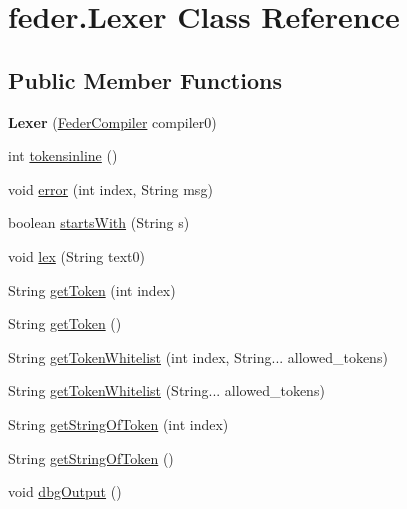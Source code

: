 \hypertarget{classfeder_1_1Lexer}{}\section{feder.\+Lexer Class Reference}
\label{classfeder_1_1Lexer}
\subsection*{Public Member Functions}
\begin{DoxyCompactItemize}
\item 
\mbox{\label{classfeder_1_1Lexer_a4642c5b1fb5d7a20d7d076ffab0a236b}} 
{\bfseries Lexer} (\hyperlink{classfeder_1_1FederCompiler}{Feder\+Compiler} compiler0)
\item 
int \hyperlink{classfeder_1_1Lexer_a4278e0e494f8a716e69bc9d24834da19}{tokensinline} ()
\item 
void \hyperlink{classfeder_1_1Lexer_abd8b18eca822366aa2d9668b9991346b}{error} (int index, String msg)
\item 
boolean \hyperlink{classfeder_1_1Lexer_aebe48a23dda741c897806ab3413f711f}{starts\+With} (String s)
\item 
void \hyperlink{classfeder_1_1Lexer_a69679a02624d16be3b567fd2aa71be57}{lex} (String text0)
\item 
String \hyperlink{classfeder_1_1Lexer_a7d9ad2063076fe1ba3b005024537a629}{get\+Token} (int index)
\item 
String \hyperlink{classfeder_1_1Lexer_a61a77f59e6000f6f6989d700e7902949}{get\+Token} ()
\item 
String \hyperlink{classfeder_1_1Lexer_aeb51675939cd32f0c6c7b896060b1379}{get\+Token\+Whitelist} (int index, String... allowed\+\_\+tokens)
\item 
String \hyperlink{classfeder_1_1Lexer_afc4f6ea269fbaf8b8a48d97d73972c2d}{get\+Token\+Whitelist} (String... allowed\+\_\+tokens)
\item 
String \hyperlink{classfeder_1_1Lexer_aa2e15cfd390d162a7ccd392d19386031}{get\+String\+Of\+Token} (int index)
\item 
String \hyperlink{classfeder_1_1Lexer_ad9de8a8d8a612b1fd99a1c8cdc327768}{get\+String\+Of\+Token} ()
\item 
void \hyperlink{classfeder_1_1Lexer_a523ea1024fa914eb932a2048f8201aa8}{dbg\+Output} ()
\end{DoxyCompactItemize}
